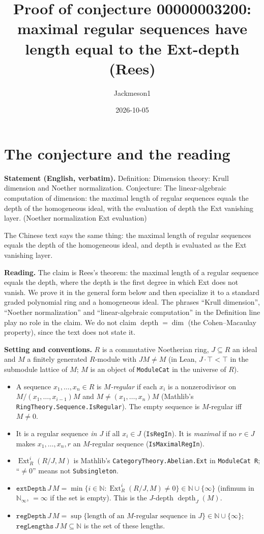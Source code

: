 \documentclass[11pt]{article}
\title{Proof of conjecture 00000003200:\\ maximal regular sequences have length equal to the Ext-depth (Rees)}
\author{Jackmeson1}
\date{2026-10-05}
\theoremstyle{definition}
\newcommand{\Ext}{\operatorname{Ext}}
\newcommand{\depth}{\operatorname{depth}}
\begin{document}
\maketitle

\section{The conjecture and the reading}

\textbf{Statement (English, verbatim).} Definition: Dimension theory: Krull dimension and Noether
normalization. Conjecture: The linear-algebraic computation of dimension: the maximal length of
regular sequences equals the depth of the homogeneous ideal, with the evaluation of depth the Ext
vanishing layer. (Noether normalization Ext evaluation)

The Chinese text says the same thing: the maximal length of regular sequences equals the depth of the
homogeneous ideal, and depth is evaluated as the Ext vanishing layer.

\textbf{Reading.} The claim is Rees's theorem: the maximal length of a regular sequence equals the
depth, where the depth is the first degree in which Ext does not vanish. We prove it in the general
form below and then specialize it to a standard graded polynomial ring and a homogeneous ideal. The
phrases ``Krull dimension'', ``Noether normalization'' and ``linear-algebraic computation'' in the
Definition line play no role in the claim. We do not claim $\depth=\dim$ (the Cohen--Macaulay
property), since the text does not state it.

\textbf{Setting and conventions.} $R$ is a commutative Noetherian ring, $J\subseteq R$ an ideal and
$M$ a finitely generated $R$-module with $JM\neq M$ (in Lean, $J\cdot\top<\top$ in the submodule
lattice of $M$; $M$ is an object of \texttt{ModuleCat} in the universe of $R$).
\begin{itemize}
\item A sequence $x_1,\dots,x_n\in R$ is \emph{$M$-regular} if each $x_i$ is a nonzerodivisor on
  $M/(x_1,\dots,x_{i-1})M$ and $M\neq(x_1,\dots,x_n)M$ (Mathlib's
  \texttt{RingTheory.Sequence.IsRegular}). The empty sequence is $M$-regular iff $M\neq0$.
\item It is a regular sequence \emph{in $J$} if all $x_i\in J$ (\texttt{IsRegIn}). It is
  \emph{maximal} if no $r\in J$ makes $x_1,\dots,x_n,r$ an $M$-regular sequence
  (\texttt{IsMaximalRegIn}).
\item $\Ext^i_R(R/J,M)$ is Mathlib's \texttt{CategoryTheory.Abelian.Ext} in \texttt{ModuleCat R};
  ``$\neq0$'' means not \texttt{Subsingleton}.
\item $\texttt{extDepth}\,J\,M=\min\{i\in\mathbb N:\Ext^i_R(R/J,M)\neq0\}\in\mathbb N\cup\{\infty\}$
  (infimum in $\mathbb N_\infty$, $=\infty$ if the set is empty). This is the $J$-depth
  $\depth_J(M)$.
\item $\texttt{regDepth}\,J\,M=\sup\{\text{length of an $M$-regular sequence in $J$}\}\in
  \mathbb N\cup\{\infty\}$; $\texttt{regLengths}\,J\,M\subseteq\mathbb N$ is the set of these lengths.
\end{itemize}
\end{document}
